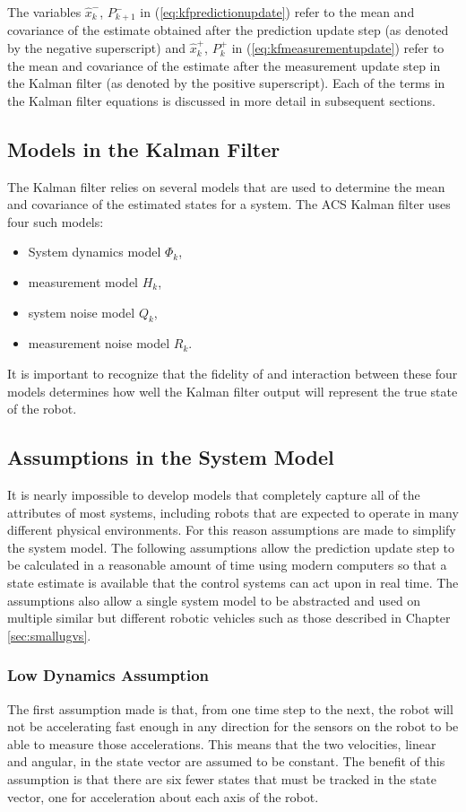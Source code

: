 The variables $\hat{x}_k^-$, $P_{k+1}^-$ in (\ref{eq:kfpredictionupdate}) refer to the mean and covariance of the estimate obtained after the prediction update step (as denoted by the negative superscript) and $\hat{x}_k^+$, $P_{k}^+$ in (\ref{eq:kfmeasurementupdate}) refer to the mean and covariance of the estimate after the measurement update step in the Kalman filter (as denoted by the positive superscript). Each of the terms in the Kalman filter equations is discussed in more detail in subsequent sections.

\subsection{Models in the Kalman Filter}
\label{sec:kfModels}
The Kalman filter relies on several models that are used to determine the mean and covariance of the estimated states for a system. The ACS Kalman filter uses four such models:
\begin{itemize}
\item System dynamics model $\Phi_k$,
\item measurement model $H_k$,
\item system noise model $Q_k$,
\item measurement noise model $R_k$.
\end{itemize}

It is important to recognize that the fidelity of and interaction between these four models determines how well the Kalman filter output will represent the true state of the robot.

\subsection{Assumptions in the System Model}
\label{sec:kfAssumptions}
It is nearly impossible to develop models that completely capture all of the attributes of most systems, including robots that are expected to operate in many different physical environments. For this reason assumptions are made to simplify the system model. The following assumptions allow the prediction update step to be calculated in a reasonable amount of time using modern computers so that a state estimate is available that the control systems can act upon in real time. The assumptions also allow a single system model to be abstracted and used on multiple similar but different robotic vehicles such as those described in Chapter \ref{sec:smallugvs}.

\subsubsection{Low Dynamics Assumption}
\label{sec:kfLowDynamicsAssumption}
The first assumption made is that, from one time step to the next, the robot will not be accelerating fast enough in any direction for the sensors on the robot to be able to measure those accelerations. This means that the two velocities, linear and angular, in the state vector are assumed to be constant. The benefit of this assumption is that there are six fewer states that must be tracked in the state vector, one for acceleration about each axis of the robot.

